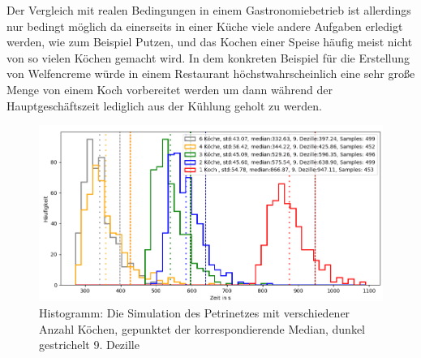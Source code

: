 Der Vergleich mit realen Bedingungen in einem Gastronomiebetrieb ist allerdings nur bedingt möglich da einerseits in einer Küche viele andere Aufgaben erledigt werden, wie zum Beispiel Putzen, und das Kochen einer Speise häufig meist nicht von so vielen Köchen gemacht wird. In dem konkreten Beispiel für die Erstellung von Welfencreme würde in einem Restaurant höchstwahrscheinlich eine sehr große Menge von einem Koch vorbereitet werden um dann während der Hauptgeschäftszeit lediglich aus der Kühlung geholt zu werden.

\begin{figure}[ht]
  \includegraphics[width=1\textwidth]{pics/sim.png}
  \caption{Histogramm: Die Simulation des Petrinetzes mit verschiedener Anzahl Köchen, gepunktet der korrespondierende Median, dunkel gestrichelt 9. Dezille}
  \label{pic:sim}
\end{figure}




